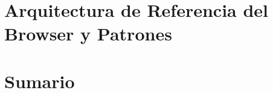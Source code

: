 \section{Arquitectura de Referencia del Browser y Patrones}
\label{chap3:ArqRefBrowandPatt}



\section{Sumario}
\label{chap3:Summ}